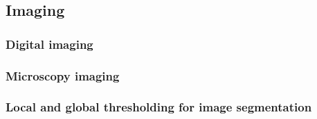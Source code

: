     \subsection{Imaging}
        \subsubsection{Digital imaging}
            
        \subsubsection{Microscopy imaging}
            
        \subsubsection{Local and global thresholding for image segmentation}
            \label{section:thresholding-theory}
            